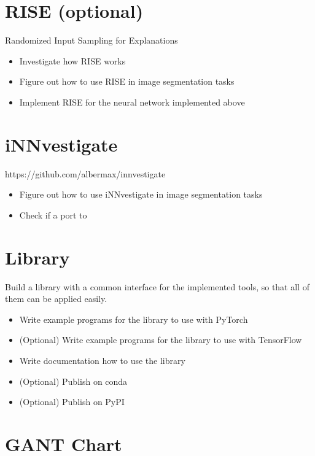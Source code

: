 \section*{RISE (optional)}
Randomized Input Sampling for Explanations
\begin{itemize}
    \item Investigate how RISE works
    \item Figure out how to use RISE in image segmentation tasks
    \item Implement RISE for the neural network implemented above
\end{itemize}

\section{iNNvestigate}
https://github.com/albermax/innvestigate

\begin{itemize}
    \item Figure out how to use iNNvestigate in image segmentation tasks
    \item Check if a port to 
\end{itemize}



\section*{Library}
Build a library with a common interface for the implemented tools, so that all of them can be applied easily.
\begin{itemize}
    \item Write example programs for the library to use with PyTorch
    \item (Optional) Write example programs for the library to use with TensorFlow
    \item Write documentation how to use the library
    \item (Optional) Publish on conda
    \item (Optional) Publish on PyPI
    
\end{itemize}

\section*{GANT Chart}
\fi
